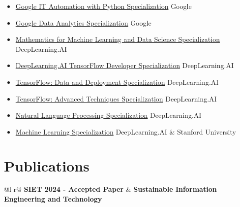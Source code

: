\documentclass[a4paper,12pt]{article}
\begin{document}
\begin{itemize}[nosep, leftmargin=1em, itemsep=3pt, label=--]
  \item \href{https://www.coursera.org/account/accomplishments/specialization/XWCXBMCME5CP}{Google IT Automation with Python Specialization} \hfill Google
  \item \href{https://www.coursera.org/account/accomplishments/specialization/ARJMR4LS8LEX}{Google Data Analytics Specialization} \hfill Google
  \item \href{https://www.coursera.org/account/accomplishments/specialization/V5EDYT656QMY}{Mathematics for Machine Learning and Data Science Specialization} \hfill DeepLearning.AI
  \item \href{https://www.coursera.org/account/accomplishments/specialization/VBCR7M7P5TKS}{DeepLearning.AI TensorFlow Developer Specialization} \hfill DeepLearning.AI
  \item \href{https://www.coursera.org/account/accomplishments/specialization/U84SJDPELJNN}{TensorFlow: Data and Deployment Specialization} \hfill DeepLearning.AI
  \item \href{https://www.coursera.org/account/accomplishments/specialization/ZPBD6NA8587G}{TensorFlow: Advanced Techniques Specialization} \hfill DeepLearning.AI
  \item \href{https://www.coursera.org/account/accomplishments/specialization/CGYD8LFTMX5Y}{Natural Language Processing Specialization} \hfill DeepLearning.AI
  \item \href{https://www.coursera.org/account/accomplishments/specialization/FQ5Y5AMR732R}{Machine Learning Specialization} \hfill DeepLearning.AI \& Stanford University
  
\end{itemize}

\hypersetup{linkcolor=blue, urlcolor=blue}


\section{Publications}
\begin{tabularx}{\linewidth}{ @{}l r@{} }
\textbf{SIET 2024 - Accepted Paper} & \hfill \textbf{Sustainable Information Engineering and Technology} \\[3.75pt]
  \\
\end{tabularx}
\end{document}
